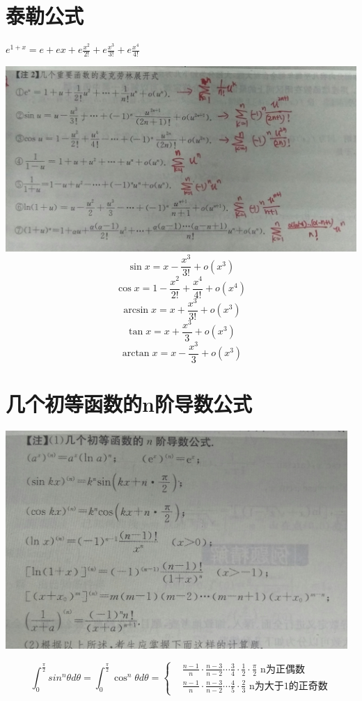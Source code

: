 \documentclass[UTF8]{ctexart}
\begin{document}
\section{泰勒公式}
$ e^{1+x}=e+ex+e \frac{x^2}{2!} + e \frac{x^3}{3!}+e\frac{x^4}{4!}$

\includegraphics[width=14cm]{9345E7/F04F85A8EB6EABFF18D6BE71383F2472.jpg}
$$ \sin x=x-\frac{x^3}{3!}+o(x^3)$$
$$ \cos x=1-\frac{x^2}{2!}+\frac{x^4}{4!}+o(x^4)$$
$$ \arcsin x=x+\frac{x^3}{3!}+o(x^3)$$
$$ \tan x=x+\frac{x^3}{3}+o(x^3)$$
$$ \arctan x=x-\frac{x^3}{3}+o(x^3)$$

\section{几个初等函数的n阶导数公式}
\includegraphics[width=13cm]{9345E7/2A793F093B002F668B144F9ED087EB77.jpg}


$$ \int_0^\frac{\pi}{2} sin^n θ d \theta =\int_0^\frac{\pi}{2} \cos^n \theta d \theta =
\begin{cases}
  &\frac{n-1}{n}\cdot\frac{n-3}{n-2} \cdots \frac{3}{4}\cdot\frac{1}{2}\cdot\frac{\pi}{2}\mbox{  n为正偶数} \\
  &\frac{n-1}{n}\cdot\frac{n-3}{n-2}\cdots\frac{4}{5}\cdot\frac{2}{3}\mbox{  n为大于1的正奇数}
\end{cases}
$$
\end{document}

